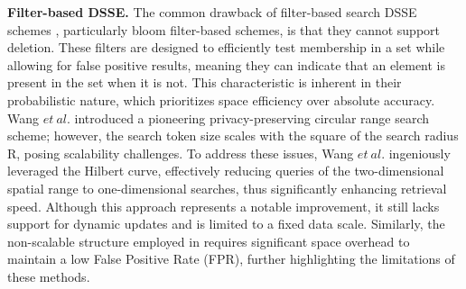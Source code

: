 \par \textbf{Filter-based DSSE.} 
The common drawback of filter-based search DSSE schemes \cite{wang2021enabling, zhu2021privacy,li2022adaptively, zhang2022efficient, miao2023efficient, li2023vrfms, tong2023verifiable}, particularly bloom filter-based schemes, is that they cannot support deletion. These filters are designed to efficiently test membership in a set while allowing for false positive results, meaning they can indicate that an element is present in the set when it is not. This characteristic is inherent in their probabilistic nature, which prioritizes space efficiency over absolute accuracy. Wang $et\ al.$ \cite{wang2015circular} introduced a pioneering privacy-preserving circular range search scheme; however, the search token size scales with the square of the search radius R, posing scalability challenges. To address these issues, Wang $et\ al.$ \cite{wang2021enabling} ingeniously leveraged the Hilbert curve, effectively reducing queries of the two-dimensional spatial range to one-dimensional searches, thus significantly enhancing retrieval speed. Although this approach represents a notable improvement, it still lacks support for dynamic updates and is limited to a fixed data scale. Similarly, the non-scalable structure employed in \cite{zhang2022efficient, miao2023efficient} requires significant space overhead to maintain a low False Positive Rate (FPR), further highlighting the limitations of these methods.
 
